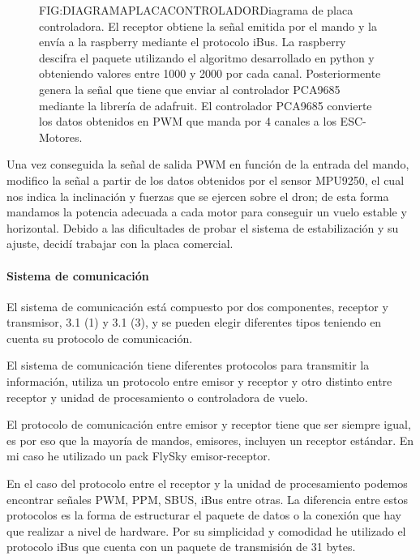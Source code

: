 \begin{figure}[Diagrama placa controladora desarrollada]{FIG:DIAGRAMAPLACACONTROLADOR}{Diagrama de placa controladora. El receptor obtiene la señal emitida por el mando y la envía a la raspberry mediante el protocolo iBus. La raspberry descifra el paquete utilizando el algoritmo desarrollado  en python y obteniendo valores entre 1000 y 2000 por cada canal. Posteriormente genera la señal que tiene que enviar al controlador PCA9685 mediante la librería de adafruit. El controlador PCA9685 convierte los datos obtenidos en PWM que manda por 4 canales a los ESC-Motores.}
\end{figure}

Una vez conseguida la señal de salida PWM en función de la entrada del mando, modifico la señal a partir de los datos obtenidos por el sensor MPU9250, el cual nos indica la inclinación y fuerzas que se ejercen sobre el dron; de esta forma mandamos la potencia adecuada a cada motor para conseguir un vuelo estable y horizontal. Debido a las dificultades de probar el sistema de estabilización y su ajuste, decidí trabajar con la placa comercial.

\paragraph{Sistema de comunicación}

	El sistema de comunicación está compuesto por dos componentes, receptor y transmisor, 3.1 (1) y 3.1 (3), y se pueden elegir diferentes tipos teniendo en cuenta su protocolo de comunicación. 
	
	El sistema de comunicación tiene diferentes protocolos para transmitir la información, utiliza un protocolo entre emisor y receptor y otro distinto entre receptor y unidad de procesamiento o controladora de vuelo\cite{Eric2017}.
	
	
	El protocolo de comunicación entre emisor y receptor tiene que ser siempre igual, es por eso que la mayoría de mandos, emisores, incluyen un receptor estándar. En mi caso he utilizado un pack FlySky emisor-receptor.
	
	En el caso del protocolo entre el receptor y la unidad de procesamiento podemos encontrar señales PWM, PPM, SBUS, iBus entre otras. La diferencia entre estos protocolos es la forma de estructurar el paquete de datos o la conexión que hay que realizar a nivel de hardware. Por su simplicidad y comodidad he utilizado el protocolo iBus que cuenta con un paquete de transmisión de 31 bytes.
	